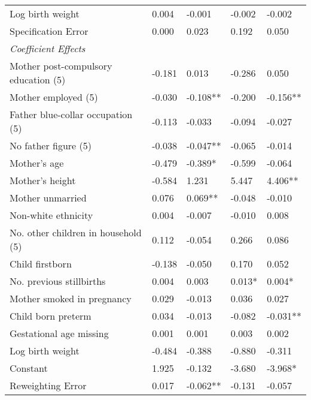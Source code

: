 \begin{table}[htbp]
\begin{tabular}{L{.3\textwidth}C{.085\textwidth}C{.085\textwidth}C{.085\textwidth}C{.085\textwidth}}
    Log birth weight & 0.004 & -0.001 & -0.002 & -0.002 \\
    Specification Error & 0.000 & 0.023 & 0.192 & 0.050 \\
    \textit{Coefficient Effects} &       &       &       &  \\
    Mother post-compulsory education (5) & -0.181 & 0.013 & -0.286 & 0.050 \\
    Mother employed (5) & -0.030 & -0.108** & -0.200 & -0.156** \\
    Father blue-collar occupation (5) & -0.113 & -0.033 & -0.094 & -0.027 \\
    No father figure (5) & -0.038 & -0.047** & -0.065 & -0.014 \\
    Mother's age & -0.479 & -0.389* & -0.599 & -0.064 \\
    Mother's height & -0.584 & 1.231 & 5.447 & 4.406** \\
    Mother unmarried & 0.076 & 0.069** & -0.048 & -0.010 \\
    Non-white ethnicity & 0.004 & -0.007 & -0.010 & 0.008 \\
    No. other children in household (5) & 0.112 & -0.054 & 0.266 & 0.086 \\
    Child firstborn & -0.138 & -0.050 & 0.170 & 0.052 \\
    No. previous stillbirths & 0.004 & 0.003 & 0.013* & 0.004* \\
    Mother smoked in pregnancy & 0.029 & -0.013 & 0.036 & 0.027 \\
    Child born preterm & 0.034 & -0.013 & -0.082 & -0.031** \\
    Gestational age missing & 0.001 & 0.001 & 0.003 & 0.002 \\
    Log birth weight & -0.484 & -0.388 & -0.880 & -0.311 \\
    Constant & 1.925 & -0.132 & -3.680 & -3.968* \\
    Reweighting Error & 0.017 & -0.062** & -0.131 & -0.057 \\
    \bottomrule
    \end{tabular}%
\endgroup
{}
\end{table}
